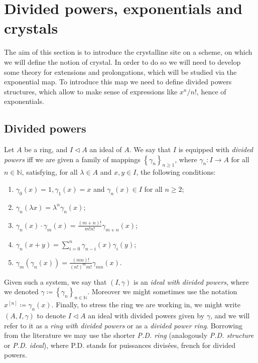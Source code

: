 \section{Divided powers, exponentials and crystals}
The aim of this section is to introduce the crystalline site on a scheme,
on which we will define the notion of crystal.
In order to do so we will need to develop some theory for extensions
and prolongations, which will be studied via the exponential map.
To introduce this map we need to define divided powers structures,
which allow to make sense of expressions like $x^n/n!$, hence of 
exponentials.



\subsection{Divided powers}
\begin{defn}\label{defn:dividedPowers}
	Let $A$ be a ring, and $I \triangleleft A$ an ideal of $A$.
	We say that $I$ is equipped with {\em divided powers} iff
	we are given a family of mappings $\left\{ \gamma_n \right\}_{n \geq 1}$,
	where $\gamma_n\colon I \to A$ for all $n \in \mathbb{N}$,
	satisfying, for all $\lambda \in A$ and $x,y \in I$, the following conditions:
	\begin{enumerate}
		\item $\gamma_0(x) = 1, \gamma_1(x) = x$ and 
			$\gamma_n(x) \in I$ for all $n \geq 2$;
		\item $\gamma_n(\lambda x) = \lambda^n \gamma_n(x)$;
		\item $\gamma_n(x) \cdot \gamma_m(x) =
			\frac{\left( m + n \right)!}{m! n!} \gamma_{m+n}(x)$;
		\item $\gamma_n(x+y) = \sum_{i=0}^{n} \gamma_{n-i}(x) \gamma_i(y)$;
		\item $\gamma_m(\gamma_n(x)) = 
			\frac{\left( mn \right)!}{\left( n! \right)^m m!} \gamma_{mn}(x)$.
	\end{enumerate}
	Given such a system, we say that $(I,\gamma)$
	is an {\em ideal with divided powers},
	where we denoted $\gamma \coloneqq \left\{ \gamma_n \right\}_{n \in \mathbb{N}}$.
	Moreover we might sometimes use the notation
	$x^{[n]} \coloneqq \gamma_n(x)$.
	Finally, to stress the ring we are working in, we might write
	$\left(A, I, \gamma\right)$ to denote $I \triangleleft A$
	an ideal with divided powers given by $\gamma$, and 
	we will refer to it as a {\em ring with divided powers}
	or as a {\em divided power ring}.
	Borrowing from the literature we may use the shorter {\em P.D. ring}
	(analogously {\em P.D. structure} or {\em P.D. ideal}), where
	P.D. stands for puissances divisées, french for divided powers.
\end{defn}


